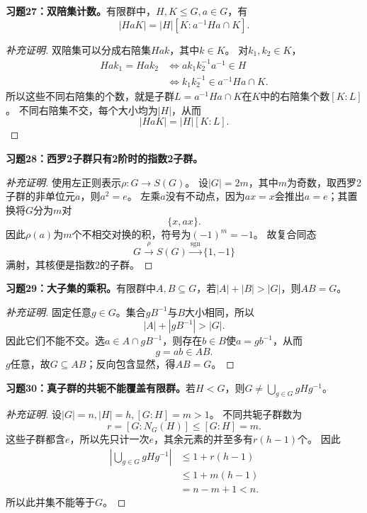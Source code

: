 \begin{problem}
\textbf{习题27：双陪集计数。}有限群中，$H,K\leq G,a\in G$，有
\[
|HaK|=|H|[K:a^{-1}Ha\cap K].
\]
\end{problem}
\begin{proof}[补充证明]
双陪集可以分成右陪集$Hak$，其中$k\in K$。
对$k_1,k_2\in K$，
\begin{align*}
Hak_1=Hak_2
&\iff ak_1k_2^{-1}a^{-1}\in H\\
&\iff k_1k_2^{-1}\in a^{-1}Ha\cap K.
\end{align*}
所以这些不同右陪集的个数，就是子群$L=a^{-1}Ha\cap K$在$K$中的右陪集个数$[K:L]$。
不同右陪集不交，每个大小均为$|H|$，从而
\[
|HaK|=|H|[K:L].
\]
\end{proof}

\begin{problem}
\textbf{习题28：西罗2子群只有2阶时的指数2子群。}
\end{problem}
\begin{proof}[补充证明]
使用左正则表示$\rho:G\to S(G)$。
设$|G|=2m$，其中$m$为奇数，取西罗2子群的非单位元$a$，则$a^2=e$。
左乘$a$没有不动点，因为$ax=x$会推出$a=e$；其置换将$G$分为$m$对
\[
\{x,ax\}.
\]
因此$\rho(a)$为$m$个不相交对换的积，符号为$(-1)^m=-1$。
故复合同态
\[
G\xrightarrow{\rho}S(G)\xrightarrow{\operatorname{sgn}}\{1,-1\}
\]
满射，其核便是指数2的子群。
\end{proof}

\begin{problem}
\textbf{习题29：大子集的乘积。}有限群中$A,B\subseteq G$，若$|A|+|B|>|G|$，则$AB=G$。
\end{problem}
\begin{proof}[补充证明]
固定任意$g\in G$。集合$gB^{-1}$与$B$大小相同，所以
\[
|A|+|gB^{-1}|>|G|.
\]
因此它们不能不交。选$a\in A\cap gB^{-1}$，则存在$b\in B$使$a=gb^{-1}$，从而
\[
g=ab\in AB.
\]
$g$任意，故$G\subseteq AB$；反向包含显然，得$AB=G$。
\end{proof}

\begin{problem}
\textbf{习题30：真子群的共轭不能覆盖有限群。}若$H<G$，则$G\neq\bigcup_{g\in G}gHg^{-1}$。
\end{problem}
\begin{proof}[补充证明]
设$|G|=n,|H|=h,[G:H]=m>1$。
不同共轭子群数为
\[
r=[G:N_G(H)]\leq[G:H]=m.
\]
这些子群都含$e$，所以先只计一次$e$，其余元素的并至多有$r(h-1)$个。
因此
\begin{align*}
\left|\bigcup_{g\in G}gHg^{-1}\right|
&\leq1+r(h-1)\\
&\leq1+m(h-1)\\
&=n-m+1<n.
\end{align*}
所以此并集不能等于$G$。
\end{proof}

